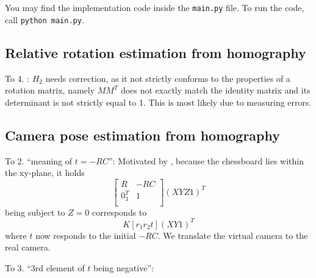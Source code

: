 \documentclass[a4paper, twoside, english]{article}
\begin{document}
You may find the implementation code inside the \lstinline{main.py} file. To run the code, call \lstinline{python main.py}.

\subsection{Relative rotation estimation from homography}

To 4. : $H_2$ needs correction, as it not strictly conforms to the properties of a rotation matrix, namely $MM^T$ does not exactly match the identity matrix and its determinant is not strictly equal to 1. This is most likely due to measuring errors. 

\subsection{Camera pose estimation from homography}

To 2. ``meaning of $t = -RC$'': Motivated by \cite{EpixeaT-RC}, because the chessboard lies within the xy-plane, it holds 
\begin{equation}
	[K|0_3]
	\begin{bmatrix}
		R	& -RC \\
		0_3^T	& 1 \\
	\end{bmatrix} (X Y Z 1)^T
\end{equation}
being subject to $Z = 0$ corresponds to
\begin{equation}
	K[r_1 r_2 t] (X Y 1)^T
\end{equation}
where $t$ now responds to the initial $-RC$. We translate the virtual camera to the real camera.

To 3. ``3rd element of $t$ being negative'':



\end{document}
